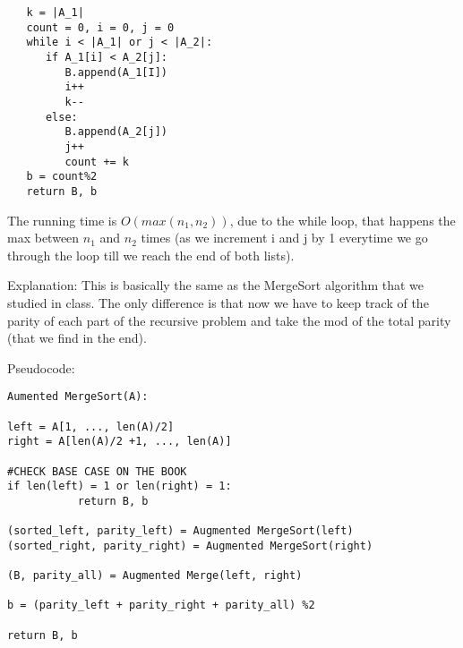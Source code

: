 \documentclass[12pt,twoside]{article}
\begin{document}
\begin{problems}
\begin{problemparts}
\begin{verbatim}
   k = |A_1|
   count = 0, i = 0, j = 0
   while i < |A_1| or j < |A_2|:
      if A_1[i] < A_2[j]:
         B.append(A_1[I])
         i++
         k--
      else:
         B.append(A_2[j])
         j++
         count += k
   b = count%2
   return B, b	
\end{verbatim}

\vspace{2mm}


\problempart%

\vspace{2mm}

The running time is $O(max (n_1, n_2))$, due to the while loop, that happens the max between $n_1$ and $n_2$ times (as we increment i and j by 1 everytime we go through the loop till we reach the end of both lists). 

\vspace{2mm}

\problempart%

\vspace{2mm}

Explanation: This is basically the same as the MergeSort algorithm that we studied in class. The only difference is that now we have to keep track of the parity of each part of the recursive problem and take the mod of the total parity (that we find in the end).

\vspace{2mm}

Pseudocode:

 \begin{verbatim}
Aumented MergeSort(A):

left = A[1, ..., len(A)/2]
right = A[len(A)/2 +1, ..., len(A)]

#CHECK BASE CASE ON THE BOOK
if len(left) = 1 or len(right) = 1:
           return B, b

(sorted_left, parity_left) = Augmented MergeSort(left)
(sorted_right, parity_right) = Augmented MergeSort(right)

(B, parity_all) = Augmented Merge(left, right)

b = (parity_left + parity_right + parity_all) %2

return B, b

\end{verbatim}

\vspace{2mm}

\problempart%

\vspace{2mm}


\end{problemparts}
\end{problems}
\end{document}
